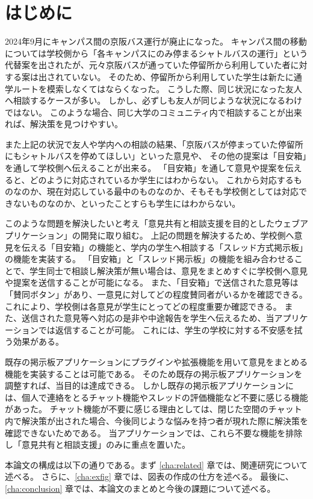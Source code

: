 \documentclass[main]{subfiles}
\begin{document}
\chapter{はじめに}
\label{cha:intro}

2024年9月にキャンパス間の京阪バス運行が廃止になった。
キャンパス間の移動については学校側から「各キャンパスにのみ停まるシャトルバスの運行」という代替案を出されたが、元々京阪バスが通っていた停留所から利用していた者に対する案は出されていない。
そのため、停留所から利用していた学生は新たに通学ルートを模索しなくてはならくなった。
こうした際、同じ状況になった友人へ相談するケースが多い。
しかし、必ずしも友人が同じような状況になるわけではない。
このような場合、同じ大学のコミュニティ内で相談することが出来れば、解決策を見つけやすい。

また上記の状況で友人や学内への相談の結果、「京阪バスが停まっていた停留所にもシャトルバスを停めてほしい」といった意見や、
その他の提案は「目安箱」を通して学校側へ伝えることが出来る。
「目安箱」を通して意見や提案を伝えると、どのように対応されているか学生にはわからない。
これから対応するものなのか、現在対応している最中のものなのか、そもそも学校側としては対応できないものなのか、といったことすらも学生にはわからない。

このような問題を解決したいと考え「意見共有と相談支援を目的としたウェブアプリケーション」の開発に取り組む。
上記の問題を解決するため、学校側へ意見を伝える「目安箱」の機能と、学内の学生へ相談する「スレッド方式掲示板」の機能を実装する。
「目安箱」と「スレッド掲示板」の機能を組み合わせることで、学生同士で相談し解決策が無い場合は、意見をまとめすぐに学校側へ意見や提案を送信することが可能になる。
また、「目安箱」で送信された意見等は「賛同ボタン」があり、一意見に対してどの程度賛同者がいるかを確認できる。
これにより、学校側は各意見が学生にとってどの程度重要か確認できる。
また、送信された意見等へ対応の是非や中途報告を学生へ伝えるため、当アプリケーションでは返信することが可能。
これには、学生の学校に対する不安感を拭う効果がある。

既存の掲示板アプリケーションにプラグインや拡張機能を用いて意見をまとめる機能を実装することは可能である。
そのため既存の掲示板アプリケーションを調整すれば、当目的は達成できる。
しかし既存の掲示板アプリケーションには、個人で連絡をとるチャット機能やスレッドの評価機能など不要に感じる機能があった。%
チャット機能が不要に感じる理由としては、閉じた空間のチャット内で解決策が出された場合、今後同じような悩みを持つ者が現れた際に解決策を確認できないためである。
当アプリケーションでは、これら不要な機能を排除し「意見共有と相談支援」のみに重点を置いた。

本論文の構成は以下の通りである。まず \ref{cha:related} 章では、関連研究について述べる。
さらに、\ref{cha:exfig} 章では、図表の作成の仕方を述べる。
最後に、\ref{cha:conclusion} 章では、本論文のまとめと今後の課題について述べる。
\end{document}
